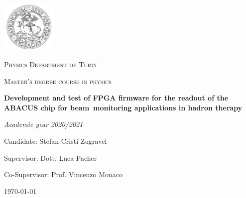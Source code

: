 \documentclass[a4paper]{report}
\begin{document}
	
	\begin{titlepage}
		\centering
		\includegraphics[width=0.2\textwidth]{img/logo_unito.JPG}\par
		\vspace{1cm}
		{\scshape\LARGE Physics Department of Turin \par}
		{\scshape\LARGE Master's degree course in physics \par}
		\vspace{4cm}
		{\Huge \textbf{Development and test of FPGA firmware for the readout of the ABACUS chip for beam~monitoring applications in hadron therapy} \par}	
		\vspace{3cm}
		{\Large\itshape Academic year 2020/2021\par}
		\vspace{1cm}
		{\large Candidate: Stefan Cristi Zugravel \par} 
		{\large Supervisor: Dott. Luca Pacher \par}
		{\large Co-Supervisor: Prof. Vincenzo Monaco \par}
		
		\vfill
		
		{\large \today\par}
	\end{titlepage}
	
	\tableofcontents
	
	
	
	
	
	
	
	
	
	
	
\end{document}

